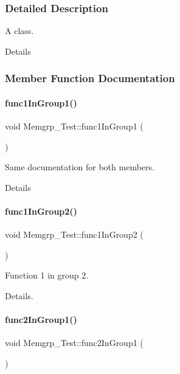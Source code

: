 \subsubsection{Detailed Description}
A class. 

Details 

\subsubsection{Member Function Documentation}
\mbox{\label{class_memgrp___test_a5052066c03efb51395b5334da4255cd2}} 
\paragraph{\texorpdfstring{func1InGroup1()}{func1InGroup1()}}
{\footnotesize\ttfamily void Memgrp\+\_\+\+Test\+::func1\+In\+Group1 (\begin{DoxyParamCaption}{ }\end{DoxyParamCaption})}



Same documentation for both members. 

Details \mbox{\label{class_memgrp___test_ab0e6553ddc36ac3cef0ac229c5dd4cdb}} 
\paragraph{\texorpdfstring{func1InGroup2()}{func1InGroup2()}}
{\footnotesize\ttfamily void Memgrp\+\_\+\+Test\+::func1\+In\+Group2 (\begin{DoxyParamCaption}{ }\end{DoxyParamCaption})}



Function 1 in group 2. 

Details. \mbox{\label{class_memgrp___test_a8296fa2c355e84ecf25522d54807548c}} 
\paragraph{\texorpdfstring{func2InGroup1()}{func2InGroup1()}}
{\footnotesize\ttfamily void Memgrp\+\_\+\+Test\+::func2\+In\+Group1 (\begin{DoxyParamCaption}{ }\end{DoxyParamCaption})}



